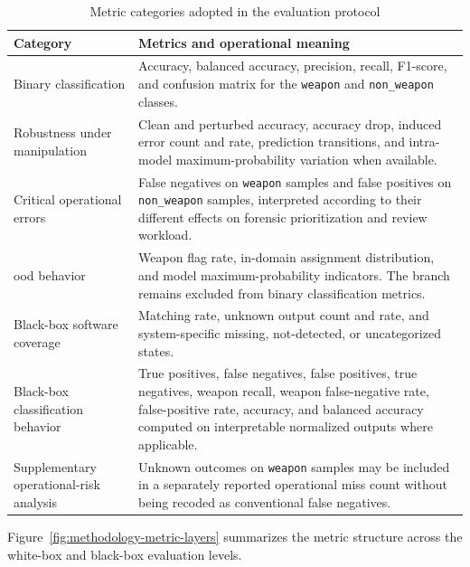\begin{table}[H]
\centering
\caption{Metric categories adopted in the evaluation protocol}
\label{tab:methodology-evaluation-metrics}
\begin{tabularx}{\textwidth}{@{}L{4.0cm}X@{}}
\toprule
\textbf{Category} &
\textbf{Metrics and operational meaning} \\
\midrule

Binary classification
&
Accuracy, balanced accuracy, precision, recall, F1-score, and confusion matrix
for the \texttt{weapon} and \texttt{non\_weapon} classes. \\

Robustness under manipulation
&
Clean and perturbed accuracy, accuracy drop, induced error count and rate,
prediction transitions, and intra-model maximum-probability variation when
available. \\

Critical operational errors
&
False negatives on \texttt{weapon} samples and false positives on
\texttt{non\_weapon} samples, interpreted according to their different effects
on forensic prioritization and review workload. \\

\gls{ood} behavior
&
Weapon flag rate, in-domain assignment distribution, and model
maximum-probability indicators. The branch remains excluded from binary
classification metrics. \\

Black-box software coverage
&
Matching rate, unknown output count and rate, and system-specific missing,
not-detected, or uncategorized states. \\

Black-box classification behavior
&
True positives, false negatives, false positives, true negatives, weapon recall,
weapon false-negative rate, false-positive rate, accuracy, and balanced accuracy
computed on interpretable normalized outputs where applicable. \\

Supplementary operational-risk analysis
&
Unknown outcomes on \texttt{weapon} samples may be included in a separately
reported operational miss count without being recoded as conventional false
negatives. \\

\bottomrule
\end{tabularx}
\end{table}

Figure~\ref{fig:methodology-metric-layers} summarizes the metric structure
across the white-box and black-box evaluation levels.

